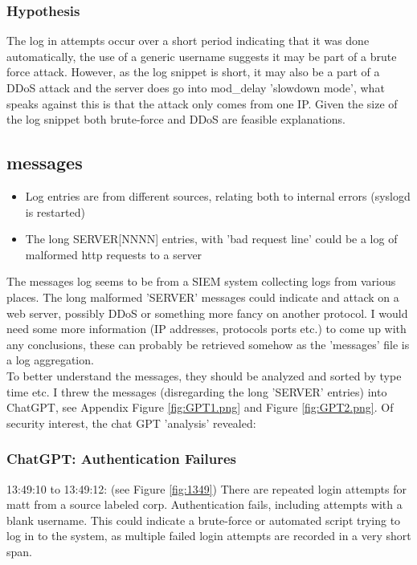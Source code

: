 \documentclass[
	letterpaper, %
	10pt, %
	unnumberedsections, %
	twoside, %
]{APAAssignment}
\begin{document}
\subsubsection{Hypothesis}
The log in attempts occur over a short period indicating that it was done automatically, the use of a generic username suggests it may be part of a brute force attack. However, as the log snippet is short, it may also be a part of a DDoS attack and the server does go into mod\_delay 'slowdown mode', what speaks against this is that the attack only comes from one IP. Given the size of the log snippet both brute-force and DDoS are feasible explanations. 

\subsection{messages}
\begin{itemize}
	\item Log entries are from different sources, relating both to internal errors (syslogd is restarted) 
	\item The long SERVER[NNNN] entries, with 'bad request line' could be a log of malformed http requests to a server
\end{itemize}


The messages log seems to be from a SIEM system collecting logs from various places.
The long malformed 'SERVER' messages could indicate and attack on a web server, possibly DDoS or something more fancy on another protocol. I would need some more information (IP addresses, protocols ports etc.) to come up with any conclusions, these can probably be retrieved somehow as the 'messages' file is a log aggregation. \\ 
To better understand the messages, they should be analyzed and sorted by type time etc. I threw the messages (disregarding the long 'SERVER' entries) into ChatGPT, see Appendix Figure \ref{fig:GPT1.png} and Figure \ref{fig:GPT2.png}. Of security interest, the chat GPT 'analysis' revealed: 

\subsubsection{ChatGPT: Authentication Failures} 13:49:10 to 13:49:12: (see Figure \ref{fig:1349}) There are repeated login attempts for matt from a source labeled corp. Authentication fails,  including attempts with a blank username. This could indicate a brute-force or automated script trying to log in to the system, as multiple failed login attempts are recorded in a very short span. \\
\end{document}
